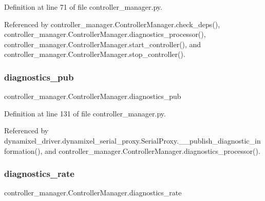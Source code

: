 Definition at line 71 of file controller\+\_\+manager.\+py.



Referenced by controller\+\_\+manager.\+Controller\+Manager.\+check\+\_\+deps(), controller\+\_\+manager.\+Controller\+Manager.\+diagnostics\+\_\+processor(), controller\+\_\+manager.\+Controller\+Manager.\+start\+\_\+controller(), and controller\+\_\+manager.\+Controller\+Manager.\+stop\+\_\+controller().

\mbox{\label{classcontroller__manager_1_1_controller_manager_a262f444500bd45723b7945fd24e07d18}} 
\subsubsection{\texorpdfstring{diagnostics\+\_\+pub}{diagnostics\_pub}}
{\footnotesize\ttfamily controller\+\_\+manager.\+Controller\+Manager.\+diagnostics\+\_\+pub}



Definition at line 131 of file controller\+\_\+manager.\+py.



Referenced by dynamixel\+\_\+driver.\+dynamixel\+\_\+serial\+\_\+proxy.\+Serial\+Proxy.\+\_\+\+\_\+publish\+\_\+diagnostic\+\_\+information(), and controller\+\_\+manager.\+Controller\+Manager.\+diagnostics\+\_\+processor().

\mbox{\label{classcontroller__manager_1_1_controller_manager_a8bc4abdce61030b2c80b29987d25a745}} 
\subsubsection{\texorpdfstring{diagnostics\+\_\+rate}{diagnostics\_rate}}
{\footnotesize\ttfamily controller\+\_\+manager.\+Controller\+Manager.\+diagnostics\+\_\+rate}



